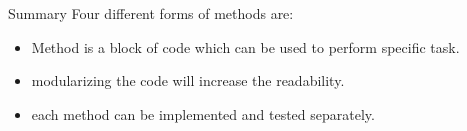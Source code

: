 \documentclass[aspectratio=169,14pt,usenames,dvipsnames]{beamer}
\begin{document}
\begin{frame}{Summary}
Four different forms of methods are:\\
\begin{itemize}
    \item Method is a block of code which can be
used to perform specific task.
\item modularizing the code will increase the
readability.
\item each method can be implemented and
tested separately.
\end{itemize}
\end{frame}
\end{document}
